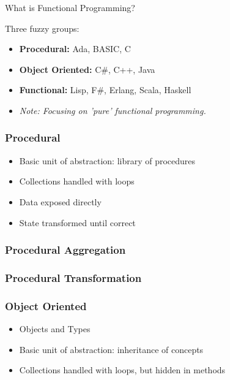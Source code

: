 \begin{frame}
  What is Functional Programming?
\end{frame}

\begin{frame}
  Three fuzzy groups:

  \begin{itemize}[<+->]
    \item \textbf{Procedural:}      Ada, BASIC, C
    \item \textbf{Object Oriented:} C\#, C++, Java
    \item \textbf{Functional:}      Lisp, F\#, Erlang, Scala, Haskell
    \item \emph{Note: Focusing on 'pure' functional programming.}
  \end{itemize}
\end{frame}

\begin{frame}
  \frametitle{Procedural}
  \pause
  \begin{itemize}[<+->]
    \item Basic unit of abstraction: library of procedures
    \item Collections handled with loops
    \item Data exposed directly
    \item State transformed until correct
  \end{itemize}
\end{frame}

\begin{frame}[fragile]
  \frametitle{Procedural Aggregation}
  \pause
  
\end{frame}

\begin{frame}[fragile]
  \frametitle{Procedural Transformation}
  \pause
  
\end{frame}

\begin{frame}
  \frametitle{Object Oriented}
  \begin{itemize}[<+->]
    \item Objects and Types
    \item Basic unit of abstraction: inheritance of concepts
    \item Collections handled with loops, but hidden in methods
  \end{itemize}
\end{frame}

